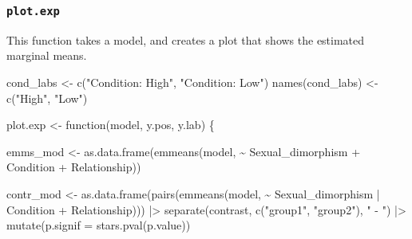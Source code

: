 \documentclass[
  bookmarksnumbered]{article}
\newenvironment{Shaded}{\begin{snugshade}}{\end{snugshade}}
\newcommand{\AttributeTok}[1]{\textcolor[rgb]{0.80,0.80,0.80}{#1}}
\newcommand{\ControlFlowTok}[1]{\textcolor[rgb]{0.94,0.87,0.69}{#1}}
\newcommand{\FunctionTok}[1]{\textcolor[rgb]{0.94,0.94,0.56}{#1}}
\newcommand{\NormalTok}[1]{\textcolor[rgb]{0.80,0.80,0.80}{#1}}
\newcommand{\OtherTok}[1]{\textcolor[rgb]{0.94,0.94,0.56}{#1}}
\newcommand{\SpecialCharTok}[1]{\textcolor[rgb]{0.86,0.64,0.64}{#1}}
\newcommand{\StringTok}[1]{\textcolor[rgb]{0.80,0.58,0.58}{#1}}
\begin{document}
\subsubsection{\texorpdfstring{\texttt{plot.exp}}{plot.exp}}\label{plot.exp}

This function takes a model, and creates a plot that shows the estimated marginal means.

\begin{Shaded}
\begin{Highlighting}[]
\NormalTok{cond\_labs }\OtherTok{\textless{}{-}} \FunctionTok{c}\NormalTok{(}\StringTok{"Condition: High"}\NormalTok{, }\StringTok{"Condition: Low"}\NormalTok{)}
\FunctionTok{names}\NormalTok{(cond\_labs) }\OtherTok{\textless{}{-}} \FunctionTok{c}\NormalTok{(}\StringTok{"High"}\NormalTok{, }\StringTok{"Low"}\NormalTok{)}

\NormalTok{plot.exp }\OtherTok{\textless{}{-}} \ControlFlowTok{function}\NormalTok{(model, y.pos, y.lab) \{}
  
\NormalTok{  emms\_mod }\OtherTok{\textless{}{-}} \FunctionTok{as.data.frame}\NormalTok{(}\FunctionTok{emmeans}\NormalTok{(model,}
                                    \SpecialCharTok{\textasciitilde{}}\NormalTok{ Sexual\_dimorphism }\SpecialCharTok{+}\NormalTok{ Condition }\SpecialCharTok{+}\NormalTok{ Relationship))}
  
\NormalTok{  contr\_mod }\OtherTok{\textless{}{-}} \FunctionTok{as.data.frame}\NormalTok{(}\FunctionTok{pairs}\NormalTok{(}\FunctionTok{emmeans}\NormalTok{(model,}
                                           \SpecialCharTok{\textasciitilde{}}\NormalTok{ Sexual\_dimorphism }\SpecialCharTok{|}\NormalTok{ Condition }\SpecialCharTok{+}\NormalTok{ Relationship))) }\SpecialCharTok{|\textgreater{}}
    \FunctionTok{separate}\NormalTok{(contrast, }\FunctionTok{c}\NormalTok{(}\StringTok{"group1"}\NormalTok{, }\StringTok{"group2"}\NormalTok{), }\StringTok{" {-} "}\NormalTok{) }\SpecialCharTok{|\textgreater{}}
    \FunctionTok{mutate}\NormalTok{(}\AttributeTok{p.signif =} \FunctionTok{stars.pval}\NormalTok{(p.value))}
  

\end{Highlighting}
\end{Shaded}
\end{document}
